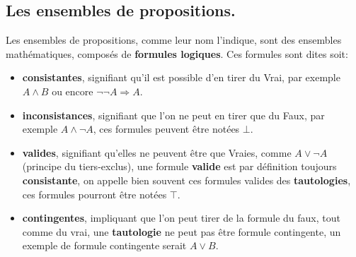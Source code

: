\documentclass[a4paper, 12pt]{article}
\newcommand{\imply}{\Rightarrow}
\numberwithin{equation}{subsection}
\begin{document}
  \subsection{Les ensembles de propositions.}
  Les ensembles de propositions, comme leur nom l'indique, sont des ensembles mathématiques, composés de {\bf formules logiques}.
  Ces formules sont dites soit: \\
  \begin{itemize}
  \item {\bf consistantes}, signifiant qu'il est possible d'en tirer du Vrai, par exemple $A \land B$ ou encore $\neg \neg A \imply A$.
  \item {\bf inconsistances}, signifiant que l'on ne peut en tirer que du Faux, par exemple $A \land \neg A$, ces formules peuvent être notées $\bot$.
  \item {\bf valides}, signifiant qu'elles ne peuvent être que Vraies, comme $A \lor \neg A$ (principe du tiers-exclus), une formule {\bf valide} est par définition toujours {\bf consistante}, on appelle bien souvent ces formules valides des {\bf tautologies}, ces formules pourront être notées $\top$. \\
  \item {\bf contingentes}, impliquant que l'on peut tirer de la formule du faux, tout comme du vrai, une {\bf tautologie} ne peut pas être formule contingente,
  un exemple de formule contingente serait $A \lor B$.
  \end{itemize}
\end{document}
